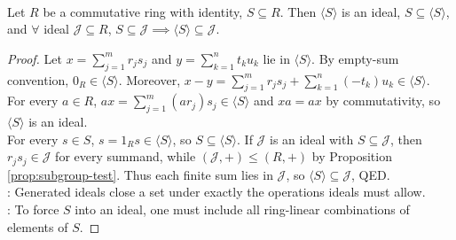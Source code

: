 \begin{proposition} \label{prop:generated-ideal-smallest-containing-set} \\
Let $R$ be a commutative ring with identity, $S\subseteq R$. Then $\langle S\rangle$ is an ideal, $S\subseteq\langle S\rangle$, and $\forall$ ideal $\mathcal{J}\subseteq R$, $S\subseteq\mathcal{J}\implies \langle S\rangle\subseteq\mathcal{J}$.
\begin{proof} Let $x=\sum\limits_{j=1}^{m}r_js_j$ and $y=\sum\limits_{k=1}^{n}t_ku_k$ lie in $\langle S\rangle$. By empty-sum convention, $0_R\in\langle S\rangle$. Moreover, $x-y=\sum\limits_{j=1}^{m}r_js_j+\sum\limits_{k=1}^{n}(-t_k)u_k\in\langle S\rangle$.\\
For every $a\in R$, $ax=\sum\limits_{j=1}^{m}(ar_j)s_j\in\langle S\rangle$ and $xa=ax$ by commutativity, so $\langle S\rangle$ is an ideal.\\
For every $s\in S$, $s=1_Rs\in\langle S\rangle$, so $S\subseteq\langle S\rangle$. If $\mathcal{J}$ is an ideal with $S\subseteq\mathcal{J}$, then $r_js_j\in\mathcal{J}$ for every summand, while $(\mathcal{J},+)\leq(R,+)$ by Proposition \ref{prop:subgroup-test}. Thus each finite sum lies in $\mathcal{J}$, so $\langle S\rangle\subseteq\mathcal{J}$, QED.\\
: Generated ideals close a set under exactly the operations ideals must allow.\\
: To force $S$ into an ideal, one must include all ring-linear combinations of elements of $S$.
\end{proof}
\end{proposition}

